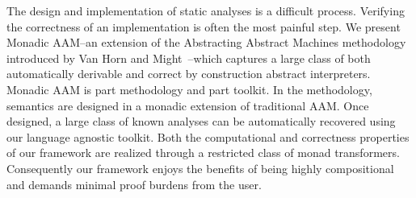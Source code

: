 The design and implementation of static analyses is a difficult process.
%
Verifying the correctness of an implementation is often the most painful step.
%
We present Monadic AAM--an extension of the Abstracting Abstract Machines
methodology introduced by Van Horn and Might~\cite{van-horn:2010:aam}--which
captures a large class of both automatically derivable and correct by
construction abstract interpreters.
%
Monadic AAM is part methodology and part toolkit.
%
In the methodology, semantics are designed in a monadic extension of
traditional AAM.
%
Once designed, a large class of known analyses can be automatically recovered
using our language agnostic toolkit.
%
Both the computational and correctness properties of our framework are realized
through a restricted class of monad transformers.
%
Consequently our framework enjoys the benefits of being highly compositional
and demands minimal proof burdens from the user.

